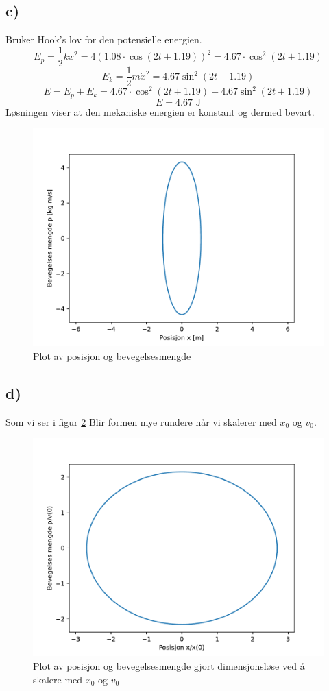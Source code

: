 \documentclass{article}
\begin{document}
\subsection*{c)}
Bruker Hook's lov for den potensielle energien. 
\[
E_p = \frac{1}{2}kx^{2} = 4 \left( 1.08 ⋅ \cos (2t + 1.19) \right) ^{2} = 4.67 ⋅ \cos ^{2}(2t + 1.19)
\]
\[
E_k = \frac{1}{2}m \dot{x}^{2} = 4.67 \sin ^{2} (2t + 1.19)
\]
\[
E = E_p + E_k = 4.67 ⋅ \cos ^{2}(2t + 1.19) + 4.67 \sin ^{2} (2t + 1.19)
\]
\[
E = 4.67 \text{ J}
\]
Løsningen viser at den mekaniske energien er konstant og dermed bevart. 

\newpage
\begin{figure}[h!]
  \centering
  \includegraphics[scale = .5]{Figures/2_c.pdf}
  \caption{Plot av posisjon og bevegelsesmengde}
  \label{fig: 2c}
\end{figure}

\subsection*{d)}
Som vi ser i figur \ref{fig: 2d} Blir formen mye rundere når vi skalerer med $x_0$ og $v_0$. 
\begin{figure}[h!]
  \centering
  \includegraphics[scale = .5]{Figures/2_d.pdf}
  \caption{Plot av posisjon og bevegelsesmengde gjort dimensjonsløse ved å skalere med $x_0$ og $v_0$}
  \label{fig: 2d}
\end{figure}
\end{document}
